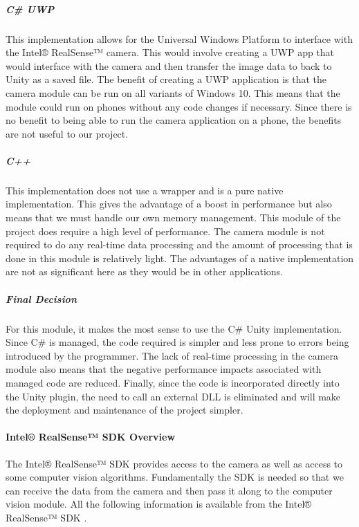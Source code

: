 \documentclass[12pt]{article}
\begin{document}
\subparagraph{C\# UWP}\label{c-uwp}

This implementation allows for the Universal Windows Platform to
interface with the Intel® RealSense™ camera. This would involve creating
a UWP app that would interface with the camera and then transfer the
image data to back to Unity as a saved file. The benefit of creating a
UWP application is that the camera module can be run on all variants of
Windows 10. This means that the module could run on phones without any
code changes if necessary. Since there is no benefit to being able to
run the camera application on a phone, the benefits are not useful to
our project.

\subparagraph{C++}\label{c}

This implementation does not use a wrapper and is a pure native
implementation. This gives the advantage of a boost in performance but
also means that we must handle our own memory management. This module of
the project does require a high level of performance. The camera module
is not required to do any real-time data processing and the amount of
processing that is done in this module is relatively light. The
advantages of a native implementation are not as significant here as
they would be in other applications.

\subparagraph{Final Decision}\label{final-decision}

For this module, it makes the most sense to use the C\# Unity
implementation. Since C\# is managed, the code required is simpler and
less prone to errors being introduced by the programmer. The lack of
real-time processing in the camera module also means that the negative
performance impacts associated with managed code are reduced. Finally,
since the code is incorporated directly into the Unity plugin, the need
to call an external DLL is eliminated and will make the deployment and
maintenance of the project simpler.

\paragraph{Intel® RealSense™ SDK
Overview}\label{intel-realsense-sdk-overview}

The Intel® RealSense™ SDK provides access to the camera as well as
access to some computer vision algorithms. Fundamentally the SDK is
needed so that we can receive the data from the camera and then pass it
along to the computer vision module. All the following information is
available from the Intel® RealSense™ SDK \autocite{IntelSDK}.
\end{document}
